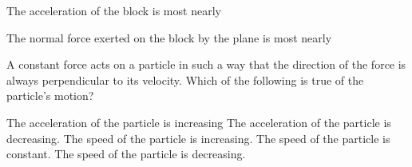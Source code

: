 \documentclass{../../oss-classkick-exam}
\begin{document}
\begin{multicols*}{2}
\begin{questions}
    
    \question The acceleration of the block is most nearly
    \label{plane1}
    
    \question The normal force exerted on the block by the plane is most nearly
    \label{plane2}
   
    \question A constant force acts on a particle in such a way that the
    direction of the force is always perpendicular to its velocity. Which of the
    following is true of the particle's motion?
    \begin{choices}
      \choice The acceleration of the particle is increasing
      \choice The acceleration of the particle is decreasing.
      \choice The speed of the particle is increasing.
      \choice The speed of the particle is constant.
      \choice The speed of the particle is decreasing.
    \end{choices}
    \vspace{.7in}


\end{questions}
\end{multicols*}
\end{document}
